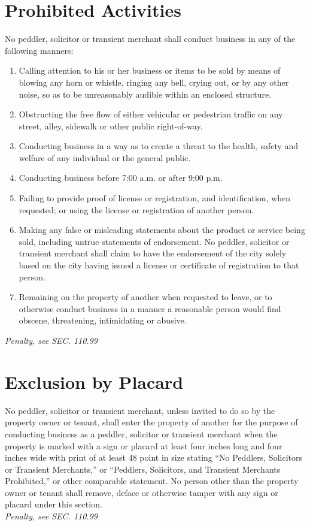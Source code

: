 \section{Prohibited Activities}
No peddler, solicitor or transient merchant shall conduct business in any of the following manners:
\begin{enumerate}[{\indent}A)]
    \item Calling attention to his or her business or items to be sold by means of blowing any horn or whistle, ringing any bell, crying out, or by any other noise, so as to be unreasonably audible within an enclosed structure.
    \item Obstructing the free flow of either vehicular or pedestrian traffic on any street, alley, sidewalk or other public right-of-way.
    \item Conducting business in a way as to create a threat to the health, safety and welfare of any individual or the general public.
    \item Conducting business before 7:00 a.m. or after 9:00 p.m.
    \item Failing to provide proof of license or registration, and identification, when requested; or using the license or registration of another person.
    \item Making any false or misleading statements about the product or service being sold, including untrue statements of endorsement.  No peddler, solicitor or transient merchant shall claim to have the endorsement of the city solely based on the city having issued a license or certificate of registration to that person.
    \item Remaining on the property of another when requested to leave, or to otherwise conduct business in a manner a reasonable person would find obscene, threatening, intimidating or abusive.
\end{enumerate}
\emph{Penalty, see SEC. 110.99}
\section{Exclusion by Placard}
No peddler, solicitor or transient merchant, unless invited to do so by the property owner or tenant, shall enter the property of another for the purpose of conducting business as a peddler, solicitor or transient merchant when the property is marked with a sign or placard at least four inches long and four inches wide with print of at least 48 point in size stating “No Peddlers, Solicitors or Transient Merchants,” or “Peddlers, Solicitors, and Transient Merchants Prohibited,” or other comparable statement.  No person other than the property owner or tenant shall remove, deface or otherwise tamper with any sign or placard under this section.\\
\emph{Penalty, see SEC. 110.99}
